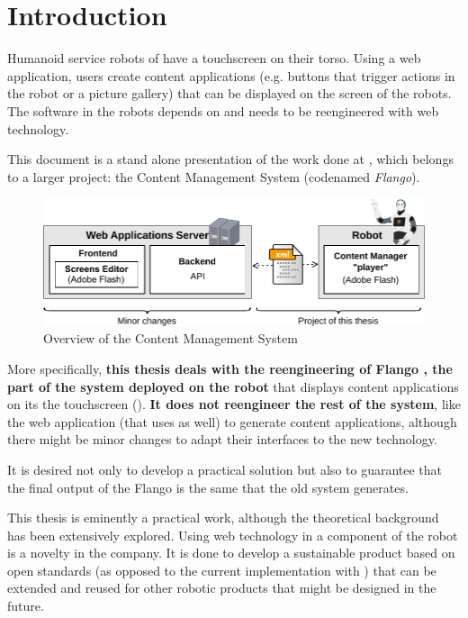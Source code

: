 \chapter{Introduction}
Humanoid service robots of \company have a touchscreen on their torso.
Using a web application, users create content applications (e.g. buttons that trigger actions in the robot or a picture gallery) that can be displayed on the screen of the robots.
The software in the robots depends on \flash and needs to be reengineered with web technology.

This document is a stand alone presentation of the work done at \company , which belongs to a larger project: the Content Management System (codenamed \textit{Flango}).
\begin{figure}[htb]
    \centering
    \includegraphics{figures/intro-system-overview.pdf}
    \caption{Overview of the Content Management System}
    \label{fig:intro-system-overview}
\end{figure}
More specifically, \textbf{this thesis deals with the reengineering of Flango \cm , the part of the system deployed \textbf{on the robot}} that displays content applications on its the touchscreen ().
\textbf{It does not reengineer the rest of the system}, like the web application (that uses \flash as well) to generate content applications, although there might be minor changes to adapt their interfaces to the new technology.

It is desired not only to develop a practical solution but also to guarantee that the final output of the Flango \cm is the same that the old system generates.

This thesis is eminently a practical work, although the theoretical background has been extensively explored. 
Using web technology in a component of the robot is a novelty in the company. 
It is done to develop a sustainable product based on open standards (as opposed to the current implementation with \flash) that can be extended and reused for other robotic products that might be designed in the future.


